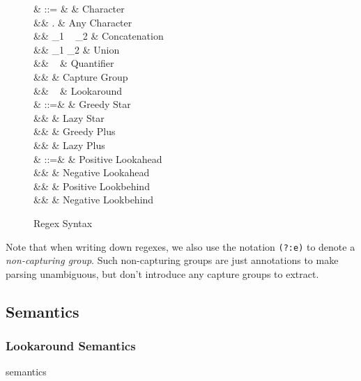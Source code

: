 \documentclass{article}
\renewcommand\cite\citep
\def\regex#1{\lstinline[style=rgx]{#1}}
\def\tregex#1{\text{\regex{#1}}}
\def\todo#1{{\color{ACMOrange}{TODO: }}#1}
\begin{document}
\begin{figure}[h]
  \begin{syntax}
\re & ::= & \char & Character \\
&\mid& . & Any Character\\
&\mid& \re_1 ~ \re_2 & Concatenation\\
&\mid& \re_1 \tregex{|} \re_2 & Union\\
&\mid&  \re ~ \quant & Quantifier \\
&\mid&  \tregex{(}\re\tregex{)} & Capture Group \\
&\mid& \tregex{(}\look~\re\tregex{)} & Lookaround \\
%
\quant & ::=& \tregex{*} & Greedy Star\\
&\mid& \tregex{*?} & Lazy Star\\
&\mid& \tregex{+} & Greedy Plus\\
&\mid& \tregex{+?} & Lazy Plus\\
%
\look & ::=& \tregex{?=} & Positive Lookahead\\
&\mid& \tregex{?!} & Negative Lookahead\\
&\mid& \tregex{?<=} & Positive Lookbehind\\
&\mid& \tregex{?<!} & Negative Lookbehind\\
  \end{syntax}
  \label{fig:syntax}
  \caption{Regex Syntax}
\end{figure}

Note that when writing down regexes, we also use the notation \regex{(?:e)} to denote a \textit{non-capturing group}.
Such non-capturing groups are just annotations to make parsing unambiguous, but don't introduce any capture groups to extract.


\subsection{Semantics}
\subsubsection{Lookaround Semantics}
\todo{semantics}
\cite{ecma_262}\cite{rewla}
\end{document}
